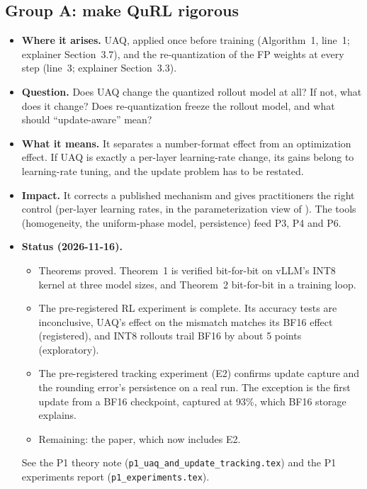 \documentclass[11pt]{article}
\begin{document}
\subsection{Group A: make QuRL rigorous}

\begin{itemize}
\item \textbf{Where it arises.} UAQ, applied once before training (Algorithm~1, line~1; explainer Section~3.7), and the re-quantization of the FP weights at every step (line~3; explainer Section~3.3).
\item \textbf{Question.} Does UAQ change the quantized rollout model at all? If not, what does it change? Does re-quantization freeze the rollout model, and what should ``update-aware'' mean?
\item \textbf{What it means.} It separates a number-format effect from an optimization effect. If UAQ is exactly a per-layer learning-rate change, its gains belong to learning-rate tuning, and the update problem has to be restated.
\item \textbf{Impact.} It corrects a published mechanism and gives practitioners the right control (per-layer learning rates, in the parameterization view of \citealp{yang2021tp4}). The tools (homogeneity, the uniform-phase model, persistence) feed P3, P4 and P6.
\item \textbf{Status (2026-11-16).}
  \begin{itemize}
  \item Theorems proved. Theorem~1 is verified bit-for-bit on vLLM's INT8 kernel at three model sizes, and Theorem~2 bit-for-bit in a training loop.
  \item The pre-registered RL experiment is complete. Its accuracy tests are inconclusive, UAQ's effect on the mismatch matches its BF16 effect (registered), and INT8 rollouts trail BF16 by about 5 points (exploratory).
  \item The pre-registered tracking experiment (E2) confirms update capture and the rounding error's persistence on a real run. The exception is the first update from a BF16 checkpoint, captured at 93\%, which BF16 storage explains.
  \item Remaining: the paper, which now includes E2.
  \end{itemize}
  See the P1 theory note (\texttt{p1\_uaq\_and\_update\_tracking.tex}) and the P1 experiments report (\texttt{p1\_experiments.tex}).
\end{itemize}
\end{document}
